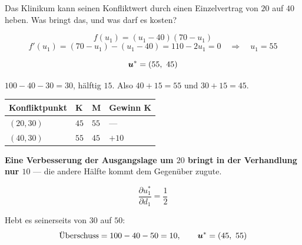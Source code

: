\begin{aufgabe}
Das Klinikum kann seinen Konfliktwert durch einen Einzelvertrag von $20$ auf $40$ heben. Was bringt das, und was darf es kosten?

\loesung
{}
\[ f(u_1) = (u_1-40)(70-u_1) \]
\[ f'(u_1) = (70-u_1)-(u_1-40) = 110-2u_1 = 0 \quad\Longrightarrow\quad u_1 = 55 \]

\[ \boldsymbol{u}^{*} = (55,\ 45) \]

 $100-40-30 = 30$, hälftig $15$. Also $40+15 = 55$ und $30+15 = 45$. \checkmark

\begin{center}
{\small
\renewcommand{\arraystretch}{1.5}
\begin{tabular}{@{}P{2.6cm}P{1.8cm}P{1.8cm}P{1.8cm}@{}}
\toprule
\textbf{Konfliktpunkt} & \textbf{K} & \textbf{M} & \textbf{Gewinn K}\\
\midrule
$(20,30)$ & $45$ & $55$ & --- \\
$(40,30)$ & $55$ & $45$ & $+10$\\
\bottomrule
\end{tabular}}
\end{center}

\begin{center}
\begin{minipage}{0.9\textwidth}
\textbf{Eine Verbesserung der Ausgangslage um $20$ bringt in der Verhandlung nur $10$} --- die andere Hälfte kommt dem Gegenüber zugute.
\end{minipage}
\end{center}

\[ \frac{\partial u_1^{*}}{\partial d_1} = \frac12 \]

\begin{center}
\begin{minipage}{0.88\textwidth}
\end{minipage}
\end{center}

Hebt es seinerseits von $30$ auf $50$:
\[ \text{Überschuss} = 100-40-50 = 10, \qquad \boldsymbol{u}^{*} = (45,\ 55) \]


\end{aufgabe}
